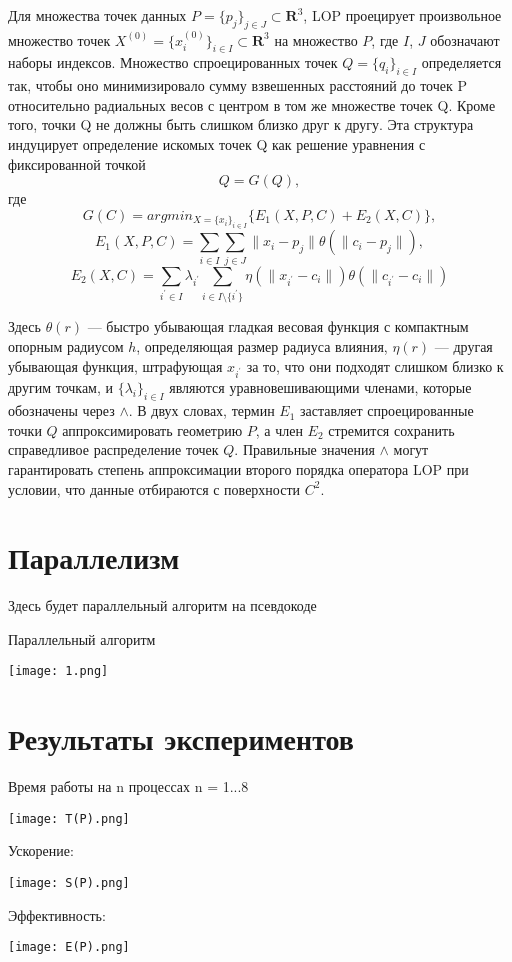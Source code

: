 Для множества точек данных $P = \{p_j\}_{j\in J} \subset \mathbf R^{3}$, LOP проецирует произвольное множество точек $X^{(0)} = \{x_i^{(0)} \} _{i \in I} \subset \mathbf R^{3}$ на множество $P$, где $I$, $J$ обозначают наборы индексов. Множество спроецированных точек $Q = \{q_i\}_{i\in I}$ определяется так, чтобы оно минимизировало сумму взвешенных расстояний до точек P относительно радиальных весов с центром в том же множестве точек Q. Кроме того, точки Q не должны быть слишком близко друг к другу. Эта структура индуцирует определение искомых точек Q как решение уравнения с фиксированной точкой 
$$Q = G(Q),$$
где
$$G(C) = argmin_{X = \{x_i\}_{i \in I}} \{E_1(X,P,C) + E_2(X,C)\},$$
$$E_1(X,P,C) = \sum_{i \in I} \sum_{j \in J}\parallel x_i - p_j \parallel \theta(\parallel c_i - p_j \parallel), $$ 
$$E_2(X, C) = \sum _{i^{'} \in I} \lambda_{i^{'}}\sum_{i \in I \setminus\{i^{'}\}} \eta(\parallel x_{i^{'}}- c_i  \parallel)\theta(\parallel c_{i^{'}} - c_i \parallel)$$

Здесь $\theta(r)$ — быстро убывающая гладкая весовая функция с компактным опорным радиусом $h$, определяющая размер радиуса влияния, $\eta(r)$ — другая убывающая функция, штрафующая $x_{i^{'}}$ за то, что они подходят слишком близко к другим точкам, и $\{\lambda_i\}_{i \in I}$ являются уравновешивающими членами, которые обозначены через $\mathbf \land$. В двух словах, термин $E_1$ заставляет спроецированные точки $Q$ аппроксимировать геометрию $P$, а член $E_2$ стремится  сохранить справедливое распределение точек $Q$. Правильные значения $\mathbf\land$ могут гарантировать степень аппроксимации второго порядка оператора LOP при условии, что данные отбираются с поверхности $C^{2}$.


\section{Параллелизм}

Здесь будет параллельный алгоритм на псевдокоде




Параллельный алгоритм

\texttt{[image: 1.png]}

\section{Результаты экспериментов}

Время работы на n процессах n = 1...8


\texttt{[image: T(P).png]}

Ускорение:

\texttt{[image: S(P).png]}

Эффективность:

\texttt{[image: E(P).png]}

